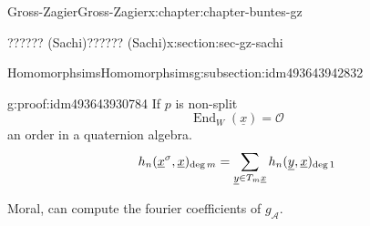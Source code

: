 \documentclass[oneside,10pt,]{book}
\newcommand{\qedhere}{\relax}
\numberwithin{equation}{section}
\newcommand{\ints}{\mathcal{O}}
\DeclareMathOperator{\End}{End}
\begin{document}
\begin{chapterptx}{Gross-Zagier}{}{Gross-Zagier}{}{}{x:chapter:chapter-buntes-gz}
\begin{sectionptx}{?????? (Sachi)}{}{?????? (Sachi)}{}{}{x:section:sec-gz-sachi}
\begin{subsectionptx}{Homomorphsims}{}{Homomorphsims}{}{}{g:subsection:idm493643942832}
\begin{proofptx}{}{g:proof:idm493643930784}
If \(p\) is non-split%
\begin{equation*}
\End_W(\underline x) = \ints
\end{equation*}
an order in a quaternion algebra.%
\begin{equation*}
h_n(\underline x^\sigma , \underline x) _{\deg m} = \sum_{\underline y\in T_m \underline x} h_n(\underline y, \underline x)_{\deg 1}\qedhere
\end{equation*}
%
\end{proofptx}
Moral, can compute the fourier coefficients of \(g_{\mathcal A}\).%
\end{subsectionptx}
\end{sectionptx}
\end{chapterptx}
%
\backmatter
%
%
%
%
%
\typeout{************************************************}
\typeout{************************************************}
%
\end{document}
